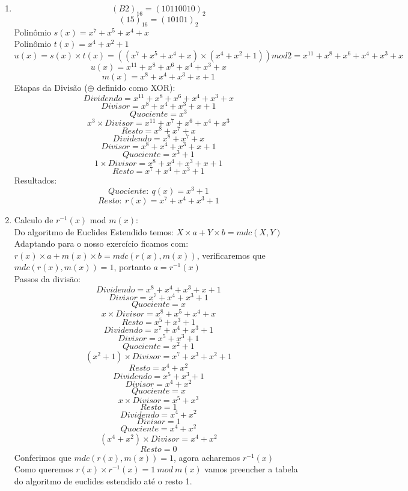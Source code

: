 \documentclass[12pt]{article}
\begin{document}
\begin{enumerate}
	\item
		$$(B2)_{16} = (10110010)_2$$ 
		$$(15)_{16} = (10101)_2$$
		Polinômio $s(x) = x^7 + x^5 + x^4 + x $\\
		Polinômio $t(x) = x^4 + x^2 + 1 $\\
		$$u(x) = s(x) \times t(x) = (( x^7 + x^5 + x^4 + x ) \times (x^4 + x^2 + 1)) mod 2 = x^{11} + x^8 + x^6 + x^4 + x^3 + x$$
		$$u(x) = x^{11} + x^8 + x^6 + x^4 + x^3 + x$$ 
		$$m(x) = x^8 + x^4 + x^3 + x + 1$$
		Etapas da Divisão ($\oplus$ definido como XOR):
		\subitem 
			$$Dividendo = x^{11} + x^8 + x^6 + x^4 + x^3 + x$$
			$$Divisor = x^8 + x^4 + x^3 + x + 1 $$
			$$Quociente = x^3$$
			$$x^3 \times Divisor = x^{11} + x^7 + x^6 + x^4 + x^3$$
			$$Resto = x^8 + x^7 + x$$	
		\subitem 
			$$Dividendo = x^8 + x^7 + x$$
			$$Divisor = x^8 + x^4 + x^3 + x + 1 $$
			$$Quociente = x^3 + 1$$
			$$1 \times Divisor = x^8 + x^4 + x^3 + x + 1$$
			$$Resto = x^7 + x^4 + x^3 + 1$$
		Resultados:
			$$Quociente: \ q(x) = x^3 + 1$$
			$$Resto: \ r(x) = x^7 + x^4 + x^3 + 1$$		
	\item
		Calculo de $r^{-1}(x)$ mod $m(x)$:\\
		Do algoritmo de Euclides Estendido temos: $X \times a + Y \times b = mdc(X, Y)$\\
		Adaptando para o nosso exercício ficamos com: $r(x)\times a + m(x) \times b = mdc(r(x), m(x))$, 
		verificaremos que $mdc(r(x), m(x)) = 1$, portanto $a = r^{-1}(x)$\\
		Passos da divisão:
		\subitem
			$$Dividendo = x^8 + x^4 + x^3 + x + 1$$
			$$Divisor = x^7 + x^4 + x^3 + 1 $$
			$$Quociente = x$$
			$$x \times Divisor = x^8 + x^5 + x^4 + x$$
			$$Resto = x^5 + x^3 + 1$$
		\subitem
			$$Dividendo = x^7 + x^4 + x^3 + 1$$
			$$Divisor = x^5 + x^3 + 1$$
			$$Quociente = x^2 + 1$$
			$$(x^2 + 1) \times Divisor = x^7 + x^3 + x^2 + 1$$
			$$Resto = x^4 + x^2$$	
		\subitem
			$$Dividendo = x^5 + x^3 + 1$$
			$$Divisor = x^4 + x^2$$
			$$Quociente = x$$
			$$x \times Divisor = x^5 + x^3$$
			$$Resto = 1$$	
		\subitem
			$$Dividendo = x^4 + x^2$$
			$$Divisor = 1$$
			$$Quociente = x^4 + x^2$$
			$$(x^4 + x^2) \times Divisor = x^4 + x^2 $$
			$$Resto = 0$$
		Conferimos que $mdc(r(x), m(x)) = 1$, agora acharemos $r^{-1}(x)$\\
		Como queremos $r(x) \times r^{-1}(x) = 1 \ mod \ m(x)$ vamos preencher a tabela do algoritmo de
		euclides estendido até o resto 1.
		\begin{table}[h]
		\centering
		\vspace{0.5cm}

\end{table}
\end{enumerate}
\end{document}
